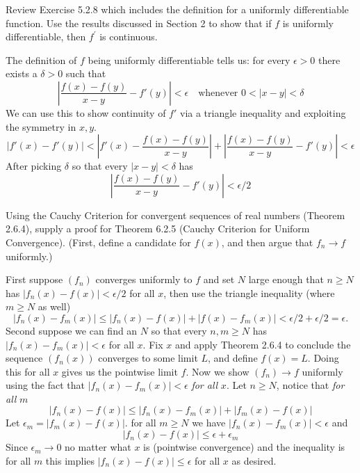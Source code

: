 \begin{exercise}
  Review Exercise 5.2.8 which includes the definition for a uniformly differentiable function. Use the results discussed in Section 2 to show that if $f$ is uniformly differentiable, then $f^{\prime}$ is continuous.

\end{exercise}
\begin{solution}
  The definition of $f$ being uniformly differentiable tells us: for every $\epsilon > 0$ there exists a $\delta > 0$ such that
  $$
  \left|\frac{f(x)-f(y)}{x-y} - f'(y)\right| < \epsilon \quad \text{whenever $0<|x-y|<\delta$}
  $$
  We can use this to show continuity of $f'$ via a triangle inequality and exploiting the symmetry in $x,y$.
  $$
  |f'(x) - f'(y)|
  < \left|f'(x) - \frac{f(x)-f(y)}{x-y}\right|
  + \left|\frac{f(x)-f(y)}{x-y} - f'(y)\right|
  < \epsilon
  $$
  After picking $\delta$ so that every $|x-y|<\delta$ has
  $$
  \left|\frac{f(x)-f(y)}{x-y} - f'(y)\right| < \epsilon/2
  $$
\end{solution}
\begin{exercise}
  Using the Cauchy Criterion for convergent sequences of real numbers (Theorem 2.6.4), supply a proof for Theorem 6.2.5 (Cauchy Criterion for Uniform Convergence). (First, define a candidate for $f(x)$, and then argue that $f_{n} \rightarrow f$ uniformly.)

\end{exercise}
\begin{solution}
  First suppose $(f_n)$ converges uniformly to $f$ and set $N$ large enough that $n \ge N$ has $|f_n(x) - f(x)| < \epsilon/2$ for all $x$, then use the triangle inequality (where $m \ge N$ as well)
  $$
  |f_n(x) - f_m(x)| \le |f_n(x) - f(x)| + |f(x) - f_m(x)| < \epsilon/2 + \epsilon/2 = \epsilon.
  $$
  Second suppose we can find an $N$ so that every $n,m \ge N$ has $|f_n(x) - f_m(x)| < \epsilon$ for all $x$.
  Fix $x$ and apply Theorem 2.6.4 to conclude the sequence $(f_n(x))$ converges to some limit $L$, and define $f(x) = L$. Doing this for all $x$ gives us the pointwise limit $f$. Now we show $(f_n) \to f$ uniformly using the fact that $|f_n(x) - f_m(x)| < \epsilon$ \emph{for all} $x$.
  Let $n \ge N$, notice that \emph{for all} $m$
  $$
  |f_n(x) - f(x)| \le |f_n(x) - f_m(x)| + |f_m(x) - f(x)|
  $$
  Let $\epsilon_m = |f_m(x) - f(x)|$. for all $m \ge N$ we have $|f_n(x) - f_m(x)| < \epsilon$ and
  $$
  |f_n(x) - f(x)| \le \epsilon + \epsilon_m
  $$
  Since $\epsilon_m \to 0$ no matter what $x$ is (pointwise convergence) and the inequality is for all $m$ this implies $|f_n(x) - f(x)| \le \epsilon$ for all $x$ as desired.
\end{solution}
